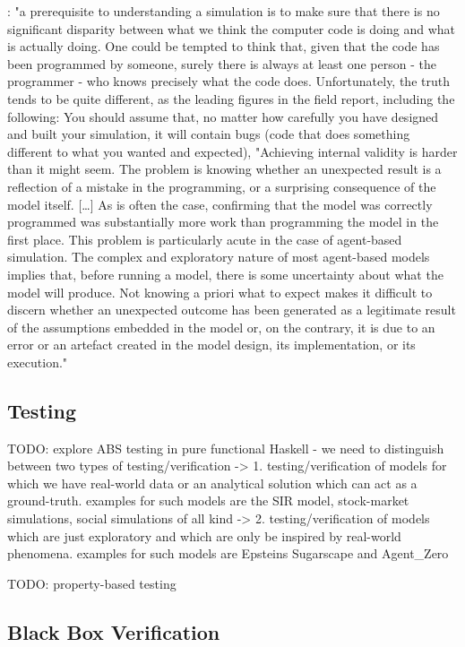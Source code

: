 \cite{galan_errors_2009}: "a prerequisite to understanding a simulation is to make sure that there is no significant disparity between what we think the computer code is doing and what is actually doing. One could be tempted to think that, given that the code has been programmed by someone, surely there is always at least one person - the programmer - who knows precisely what the code does. Unfortunately, the truth tends to be quite different, as the leading figures in the field report, including the following: You should assume that, no matter how carefully you have designed and built your simulation, it will contain bugs (code that does something different to what you wanted and expected), "Achieving internal validity is harder than it might seem. The problem is knowing whether an unexpected result is a reflection of a mistake in the programming, or a surprising consequence of the model itself. […] As is often the case, confirming that the model was correctly programmed was substantially more work than programming the model in the first place. This problem is particularly acute in the case of agent-based simulation. The complex and exploratory nature of most agent-based models implies that, before running a model, there is some uncertainty about what the model will produce. Not knowing a priori what to expect makes it difficult to discern whether an unexpected outcome has been generated as a legitimate result of the assumptions embedded in the model or, on the contrary, it is due to an error or an artefact created in the model design, its implementation, or its execution."

\subsection{Testing}
TODO: explore ABS testing in pure functional Haskell
- we need to distinguish between two types of testing/verification
	-> 1. testing/verification of models for which we have real-world data or an analytical solution which can act as a ground-truth. examples for such models are the SIR model, stock-market simulations, social simulations of all kind
	-> 2. testing/verification of models which are just exploratory and which are only be inspired by real-world phenomena. examples for such models are Epsteins Sugarscape and Agent\_Zero

TODO: property-based testing

\subsection{Black Box Verification}

